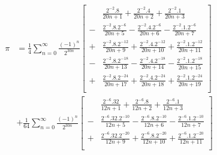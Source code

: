 \documentclass[11pt]{article}
\begin{document}
\begin{equation}
\begin{split}
  \pi
  &= \frac{1}{4} \sum_{n = 0}^\infty \frac{(-1)^n}{2^{30n}} \left[
    \begin{aligned}
    &  \frac{2^{-2}.8}{20n+1}
    +  \frac{2^{-2}.4}{20n+2}
    +  \frac{2^{-2}.1}{20n+3} \\
    -& \frac{2^{-2}.8.2^{-6}}{20n+5}
    -  \frac{2^{-2}.4.2^{-6}}{20n+6}
    -  \frac{2^{-2}.1.2^{-6}}{20n+7} \\
    +& \frac{2^{-2}.8.2^{-12}}{20n+9}
    +  \frac{2^{-2}.4.2^{-12}}{20n+10}
    +  \frac{2^{-2}.1.2^{-12}}{20n+11} \\
    -& \frac{2^{-2}.8.2^{-18}}{20n+13} 
    -  \frac{2^{-2}.4.2^{-18}}{20n+14}
    -  \frac{2^{-2}.1.2^{-18}}{20n+15} \\
    +& \frac{2^{-2}.8.2^{-24}}{20n+17}
    +  \frac{2^{-2}.4.2^{-24}}{20n+18}
    +  \frac{2^{-2}.1.2^{-24}}{20n+19} \\
    \end{aligned}
  \right] \\
  &+ \frac{1}{64} \sum_{n = 0}^\infty \frac{(-1)^n}{2^{30n}} \left[
    \begin{aligned}
    &  \frac{2^{-6}.32}{12n+1}
    +  \frac{2^{-6}.8}{12n+2}
    +  \frac{2^{-6}.1}{12n+3} \\
    -& \frac{2^{-6}.32.2^{-10}}{12n+5}
    -  \frac{2^{-6}.8.2^{-10}}{12n+6}
    -  \frac{2^{-6}.1.2^{-10}}{12n+7} \\
    +& \frac{2^{-6}.32.2^{-20}}{12n+9}
    +  \frac{2^{-6}.8.2^{-20}}{12n+10}
    +  \frac{2^{-6}.1.2^{-20}}{12n+11} \\
    \end{aligned}
  \right]
\end{split}
\end{equation}
\end{document}
